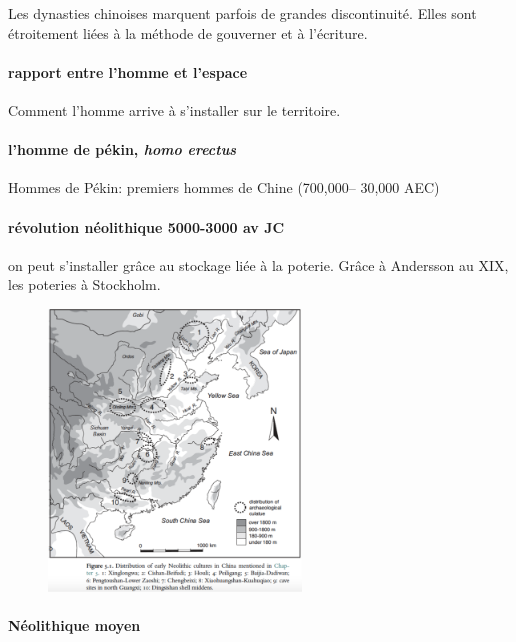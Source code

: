 \begin{Prop}
    Les dynasties chinoises marquent parfois de grandes discontinuité. Elles sont étroitement liées à la méthode de gouverner et à l'écriture.
\end{Prop}

\paragraph{rapport entre l'homme et l'espace} Comment l'homme arrive à s'installer sur le territoire. 

\paragraph{l'homme de pékin, \textit{homo erectus}} Hommes de Pékin: premiers hommes de Chine (700,000– 30,000 AEC)

\paragraph{révolution néolithique 5000-3000 av JC} on peut s'installer grâce au stockage liée à la poterie.
Grâce à Andersson au XIX, les poteries à Stockholm.
\begin{figure}[!h]
    \centering
\includegraphics[width=0.6\textwidth]{ConfucianismeTaoismeBouddhismeChinois/Images/NeolithiqueAncien.png}

    \label{fig:enter-label}
\end{figure}

\paragraph{Néolithique moyen}


